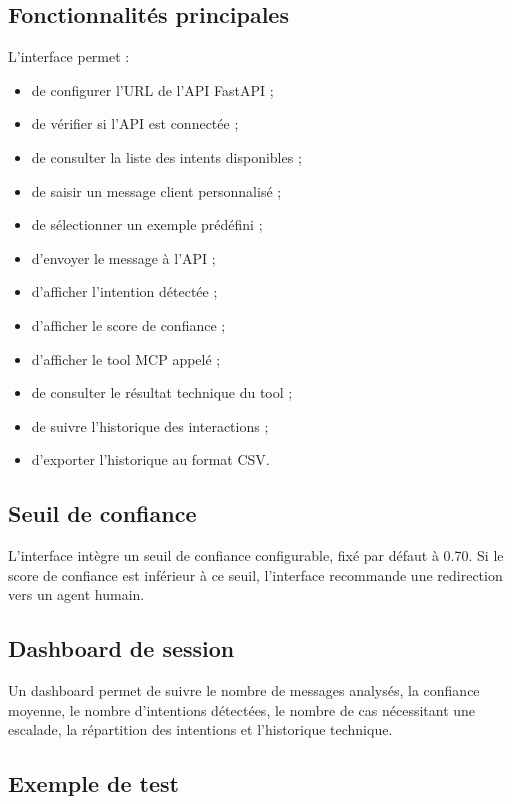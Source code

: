 \documentclass[12pt,a4paper]{report}
\begin{document}
\subsection{Fonctionnalités principales}

L'interface permet :

\begin{itemize}
    \item de configurer l'URL de l'API FastAPI ;
    \item de vérifier si l'API est connectée ;
    \item de consulter la liste des intents disponibles ;
    \item de saisir un message client personnalisé ;
    \item de sélectionner un exemple prédéfini ;
    \item d'envoyer le message à l'API ;
    \item d'afficher l'intention détectée ;
    \item d'afficher le score de confiance ;
    \item d'afficher le tool MCP appelé ;
    \item de consulter le résultat technique du tool ;
    \item de suivre l'historique des interactions ;
    \item d'exporter l'historique au format CSV.
\end{itemize}

\subsection{Seuil de confiance}

L'interface intègre un seuil de confiance configurable, fixé par défaut à 0.70. Si le score de confiance est inférieur à ce seuil, l'interface recommande une redirection vers un agent humain.

\subsection{Dashboard de session}

Un dashboard permet de suivre le nombre de messages analysés, la confiance moyenne, le nombre d'intentions détectées, le nombre de cas nécessitant une escalade, la répartition des intentions et l'historique technique.

\subsection{Exemple de test}
\end{document}

